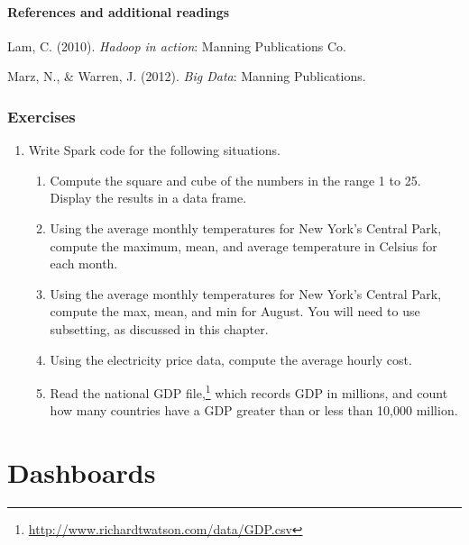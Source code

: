 \documentclass[
]{article}
\begin{document}
\hypertarget{references-and-additional-readings-5}{%
\paragraph*{References and additional readings}\label{references-and-additional-readings-5}}

Lam, C. (2010). \emph{Hadoop in action}: Manning Publications Co.

Marz, N., \& Warren, J. (2012). \emph{Big Data}: Manning Publications.

\hypertarget{exercises-9}{%
\subsubsection*{Exercises}\label{exercises-9}}

\begin{enumerate}
\def\labelenumi{\arabic{enumi}.}
\item
  Write Spark code for the following situations.

  \begin{enumerate}
  \def\labelenumii{\alph{enumii}.}
  \item
    Compute the square and cube of the numbers in the range 1 to 25.
    Display the results in a data frame.
  \item
    Using the average monthly temperatures for New York's Central
    Park, compute the maximum, mean, and average temperature in
    Celsius for each month.
  \item
    Using the average monthly temperatures for New York's Central
    Park, compute the max, mean, and min for August. You will need
    to use subsetting, as discussed in this chapter.
  \item
    Using the electricity price data, compute the average hourly
    cost.
  \item
    Read the national GDP file,\footnote{\url{http://www.richardtwatson.com/data/GDP.csv}} which records
    GDP in millions, and count how many countries have a GDP greater
    than or less than 10,000 million.
  \end{enumerate}
\end{enumerate}

\hypertarget{dashboards}{%
\section{Dashboards}\label{dashboards}}
\end{document}
